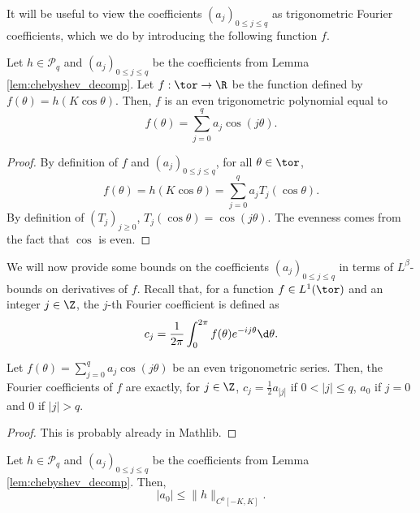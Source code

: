 It will be useful to view the coefficients $(a_j)_{0 \leq j \leq q}$ as trigonometric
Fourier coefficients, which we do by introducing the following function $f$.

\begin{lemma}
  \label{lem:f_def}
  Let $h \in \mathcal{P}_q$ and $(a_j)_{0 \leq j \leq q}$ be the coefficients from Lemma
  \ref{lem:chebyshev_decomp}.
  Let $f : \tor \rightarrow \R$ be the function defined by $f(\theta) = h(K \cos \theta)$.
  Then, $f$ is an even trigonometric polynomial equal to
  \begin{equation*}
    f(\theta)
    =
      \sum_{j=0}^q a_j \cos(j \theta).
 \end{equation*}
\end{lemma}

\begin{proof}
  By definition of $f$ and $(a_j)_{0 \leq j \leq q}$,
  for all $\theta \in \tor$,
  \begin{equation*}
    f(\theta) = h(K \cos \theta) = \sum_{j=0}^q a_j T_j(\cos \theta).
  \end{equation*}
  By definition of $(T_j)_{j \geq 0}$, $T_j(\cos \theta) = \cos (j \theta)$.
  The evenness comes from the fact that $\cos$ is even.
\end{proof}

We will now provide some bounds on the coefficients $(a_j)_{0 \leq j \leq q}$
in terms of $L^\beta$-bounds on derivatives of $f$.
Recall that, for a function $f \in L^1(\tor)$ and an integer $j \in \Z$,
the $j$-th Fourier coefficient is defined as
\begin{equation*}
  c_j = \frac{1}{2 \pi} \int_0^{2 \pi} f(\theta) e^{-i j \theta} \d \theta.
\end{equation*}

\begin{lemma}
  \label{lem:coeff_of_f}
  Let $f(\theta) = \sum_{j=0}^q a_j \cos(j \theta)$ be an even trigonometric series.
  Then, the Fourier coefficients of $f$ are exactly, for $j \in \Z$,
  $c_j = \frac{1}{2} a_{|j|}$ if $0 < |j| \leq q$, $a_0$ if $j=0$ and $0$ if $|j|>q$.
\end{lemma}

\begin{proof}
  This is probably already in Mathlib.
\end{proof}


\begin{lemma}
  \label{lem:bound_a0}
  Let $h \in \mathcal{P}_q$ and $(a_j)_{0 \leq j \leq q}$ be the coefficients from Lemma
  \ref{lem:chebyshev_decomp}.
  Then,
  \begin{equation*}
    |a_0| \leq \| h \|_{C^0[-K,K]}.
  \end{equation*}
\end{lemma}

